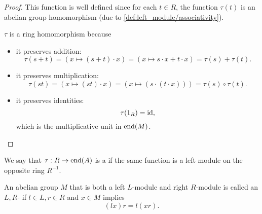 \begin{proof}
  This function is well defined since for each \( t \in R \), the function \( \tau(t) \) is an abelian group homomorphism (due to \ref{def:left_module/associativity}).

  \( \tau \) is a ring homomorphism because
  \begin{itemize}
    \item it preserves addition:
    \begin{equation*}
      \tau(s + t)
      =
      (x \mapsto (s + t) \cdot x)
      =
      (x \mapsto s \cdot x + t \cdot x)
      =
      \tau(s) + \tau(t).
    \end{equation*}

    \item it preserves multiplication:
    \begin{equation*}
      \tau(st)
      =
      (x \mapsto (st) \cdot x)
      =
      (x \mapsto (s \cdot (t \cdot x)))
      =
      \tau(s) \circ \tau(t).
    \end{equation*}

    \item it preserves identities:
    \begin{equation*}
      \tau(1_R)
      =
      \operatorname{id},
    \end{equation*}
    which is the multiplicative unit in \( \operatorname{end}(M) \).
  \end{itemize}
\end{proof}

\begin{definition}\label{def:right_module}
  We say that \( \tau: R \to \operatorname{end}(A) \) is a  if the same function is a left module on the opposite ring \( R^{-1} \).
\end{definition}

\begin{definition}\label{def:bimodule}
  An abelian group \( M \) that is both a left \( L \)-module and right \( R \)-module is called an \( L, R \)- if \( l \in L, r \in R \) and \( x \in M \) implies
  \begin{equation*}
    (lx)r = l(xr).
  \end{equation*}
\end{definition}

